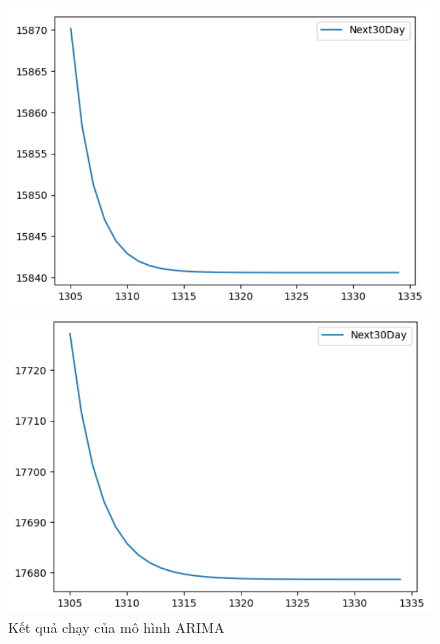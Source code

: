 \begin{figure}[H]
\begin{minipage}{0.15\textwidth}
    \includegraphics[width=1\textwidth]{resources/chapter-5/newdata/predicted/EIB_ARIMA_8-2_30days.png}
    \end{minipage}
    \hfill
        \begin{minipage}{0.15\textwidth}
    \centering
    \includegraphics[width=1\textwidth]{resources/chapter-5/newdata/predicted/EIB_ARIMA_9-1_30days.png}
    \end{minipage}
    \hfill
    
    \caption{Kết quả chạy của mô hình ARIMA}
    \label{fig:arima_predicted}
\end{figure}




